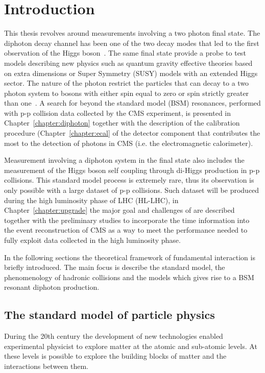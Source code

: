 \chapter{Introduction}
\label{chapter:introduction}

This thesis revolves around measurements involving a two photon final state.
The diphoton decay channel has been one of the two decay modes that led to the
first observation of the Higgs boson~\cite{cms_atlas_hgg_comb}. The same
final state provide a probe to test models describing new physics such as quantum gravity
effective theories based on extra dimensions or Super Symmetry (SUSY) models with an extended
Higgs sector. The nature of the photon restrict the
particles that can decay to a two photon system to bosons with either
spin equal to zero or spin strictly greater than one~\cite{landau,yang}.
A search for beyond the standard model (BSM) resonances, performed with p-p collision data collected by the CMS experiment,
is presented in Chapter~\ref{chapter:diphoton} together with the description of the calibration procedure (Chapter~\ref{chapter:ecal}
of the detector component that contributes the most to the detection of photons in CMS (i.e. the electromagnetic calorimeter).

Measurement involving a diphoton system in the final state also includes the measurement of the Higgs boson self coupling
through di-Higgs production in p-p collisions. This standard model process is extremely rare, thus its observation is
only possible with a large dataset of p-p collisions. Such dataset will be produced during the high luminosity
phase of LHC (HL-LHC), in Chapter~\ref{chapter:upgrade} the major goal and challenges of are described together with
the preliminary studies to incorporate the time information into the event reconstruction of CMS as a way to meet
the performance needed to fully exploit data collected in the high luminosity phase.

In the following sections the theoretical framework of fundamental interaction is briefly introduced.
The main focus is describe the standard model, the phenomenology of hadronic collisions and the models
which gives rise to a BSM resonant diphoton production.

\section{The standard model of particle physics}
During the 20th century the development of new technologies enabled experimental
physicist to explore matter at the atomic and sub-atomic levels. At these levels
is possible to explore the building blocks of matter and the interactions between them.

